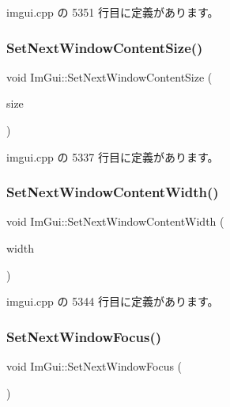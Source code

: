  imgui.\+cpp の 5351 行目に定義があります。

\mbox{\label{namespace_im_gui_aae55a58c38d8e84b10eb1e8b1531372d}} 
\subsubsection{\texorpdfstring{Set\+Next\+Window\+Content\+Size()}{SetNextWindowContentSize()}}
{\footnotesize\ttfamily void Im\+Gui\+::\+Set\+Next\+Window\+Content\+Size (\begin{DoxyParamCaption}\item[{const \mbox{\hyperlink{struct_im_vec2}{Im\+Vec2}} \&}]{size }\end{DoxyParamCaption})}



 imgui.\+cpp の 5337 行目に定義があります。

\mbox{\label{namespace_im_gui_a94731b8482ed9298a9ac454061e79e8a}} 
\subsubsection{\texorpdfstring{Set\+Next\+Window\+Content\+Width()}{SetNextWindowContentWidth()}}
{\footnotesize\ttfamily void Im\+Gui\+::\+Set\+Next\+Window\+Content\+Width (\begin{DoxyParamCaption}\item[{float}]{width }\end{DoxyParamCaption})}



 imgui.\+cpp の 5344 行目に定義があります。

\mbox{\label{namespace_im_gui_ac2d2b163c95cd8c8391aba85bc50d170}} 
\subsubsection{\texorpdfstring{Set\+Next\+Window\+Focus()}{SetNextWindowFocus()}}
{\footnotesize\ttfamily void Im\+Gui\+::\+Set\+Next\+Window\+Focus (\begin{DoxyParamCaption}{ }\end{DoxyParamCaption})}



